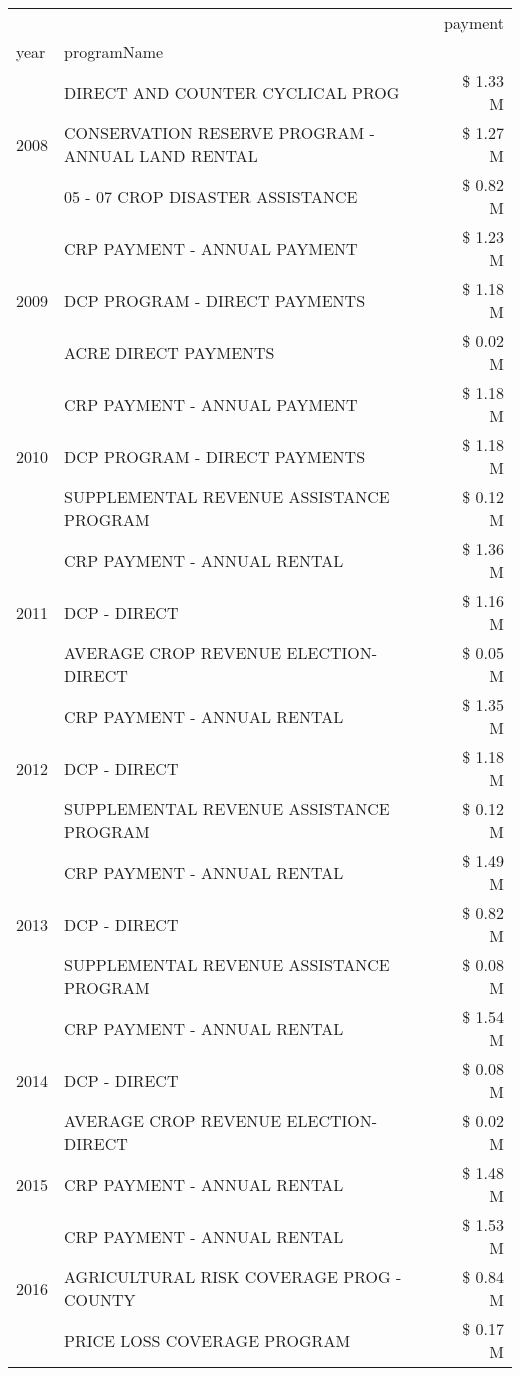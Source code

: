 \begin{tabular}{llr}
\toprule
 &  & payment \\
year & programName &  \\
\midrule
\multirow[t]{3}{*}{2008} & DIRECT AND COUNTER CYCLICAL PROG & \$ 1.33 M \\
 & CONSERVATION RESERVE PROGRAM - ANNUAL LAND RENTAL & \$ 1.27 M \\
 & 05 - 07 CROP DISASTER ASSISTANCE & \$ 0.82 M \\
\cline{1-3}
\multirow[t]{3}{*}{2009} & CRP PAYMENT - ANNUAL PAYMENT & \$ 1.23 M \\
 & DCP PROGRAM - DIRECT PAYMENTS & \$ 1.18 M \\
 & ACRE DIRECT PAYMENTS & \$ 0.02 M \\
\cline{1-3}
\multirow[t]{3}{*}{2010} & CRP PAYMENT - ANNUAL PAYMENT & \$ 1.18 M \\
 & DCP PROGRAM - DIRECT PAYMENTS & \$ 1.18 M \\
 & SUPPLEMENTAL REVENUE ASSISTANCE PROGRAM & \$ 0.12 M \\
\cline{1-3}
\multirow[t]{3}{*}{2011} & CRP PAYMENT - ANNUAL RENTAL & \$ 1.36 M \\
 & DCP - DIRECT & \$ 1.16 M \\
 & AVERAGE CROP REVENUE ELECTION-DIRECT & \$ 0.05 M \\
\cline{1-3}
\multirow[t]{3}{*}{2012} & CRP PAYMENT - ANNUAL RENTAL & \$ 1.35 M \\
 & DCP - DIRECT & \$ 1.18 M \\
 & SUPPLEMENTAL REVENUE ASSISTANCE PROGRAM & \$ 0.12 M \\
\cline{1-3}
\multirow[t]{3}{*}{2013} & CRP PAYMENT - ANNUAL RENTAL & \$ 1.49 M \\
 & DCP - DIRECT & \$ 0.82 M \\
 & SUPPLEMENTAL REVENUE ASSISTANCE PROGRAM & \$ 0.08 M \\
\cline{1-3}
\multirow[t]{3}{*}{2014} & CRP PAYMENT - ANNUAL RENTAL & \$ 1.54 M \\
 & DCP - DIRECT & \$ 0.08 M \\
 & AVERAGE CROP REVENUE ELECTION-DIRECT & \$ 0.02 M \\
\cline{1-3}
2015 & CRP PAYMENT - ANNUAL RENTAL & \$ 1.48 M \\
\cline{1-3}
\multirow[t]{3}{*}{2016} & CRP PAYMENT - ANNUAL RENTAL & \$ 1.53 M \\
 & AGRICULTURAL RISK COVERAGE PROG - COUNTY & \$ 0.84 M \\
 & PRICE LOSS COVERAGE PROGRAM & \$ 0.17 M \\

\end{tabular}

